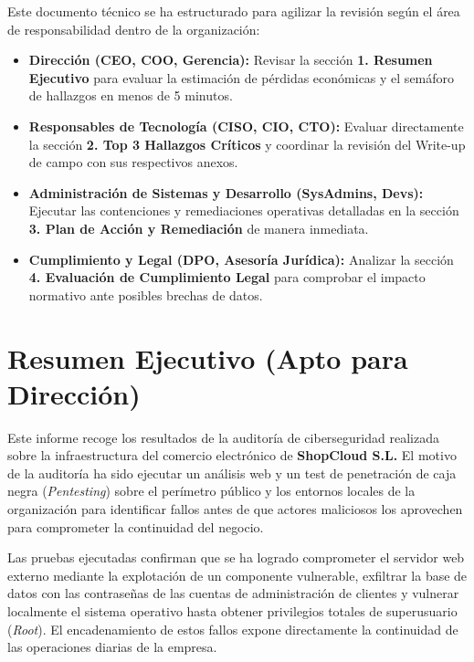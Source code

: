 \documentclass[11pt,a4paper]{report}
\begin{document}
Este documento técnico se ha estructurado para agilizar la revisión según el área de responsabilidad dentro de la organización:

\begin{itemize}
    \item \textbf{Dirección (CEO, COO, Gerencia):} Revisar la sección \textbf{1. Resumen Ejecutivo} para evaluar la estimación de pérdidas económicas y el semáforo de hallazgos en menos de 5 minutos.
    \item \textbf{Responsables de Tecnología (CISO, CIO, CTO):} Evaluar directamente la sección \textbf{2. Top 3 Hallazgos Críticos} y coordinar la revisión del Write-up de campo con sus respectivos anexos.
    \item \textbf{Administración de Sistemas y Desarrollo (SysAdmins, Devs):} Ejecutar las contenciones y remediaciones operativas detalladas en la sección \textbf{3. Plan de Acción y Remediación} de manera inmediata.
    \item \textbf{Cumplimiento y Legal (DPO, Asesoría Jurídica):} Analizar la sección \textbf{4. Evaluación de Cumplimiento Legal} para comprobar el impacto normativo ante posibles brechas de datos.
\end{itemize}

\newpage

\chapter{Resumen Ejecutivo (Apto para Dirección)}

Este informe recoge los resultados de la auditoría de ciberseguridad realizada sobre la infraestructura del comercio electrónico de \textbf{ShopCloud S.L.} El motivo de la auditoría ha sido ejecutar un análisis web y un test de penetración de caja negra (\textit{Pentesting}) sobre el perímetro público y los entornos locales de la organización para identificar fallos antes de que actores maliciosos los aprovechen para comprometer la continuidad del negocio.

Las pruebas ejecutadas confirman que se ha logrado comprometer el servidor web externo mediante la explotación de un componente vulnerable, exfiltrar la base de datos con las contraseñas de las cuentas de administración de clientes y vulnerar localmente el sistema operativo hasta obtener privilegios totales de superusuario (\textit{Root}). El encadenamiento de estos fallos expone directamente la continuidad de las operaciones diarias de la empresa.
\end{document}
